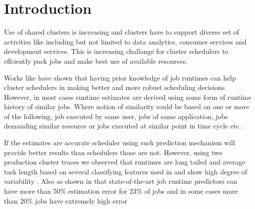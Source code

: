 \section{Introduction}
\label{sec:intro}



Use of shared clusters is increasing and clusters have to support diverse set
of activities like including but not limited to data analytics, consumer
services and development services. This is increasing challange for cluster
schedulers to effciently pack jobs and make best use of available resources.

Works like \cite{tetrisched, morpheus, 3Sigma,
Socc14:IfYouAreLateDon'tBlameUs} have shown that having prior knowledge of job
runtimes can help cluster schedulers in making better and more robust
scheduling decisions. However, in most cases runtime estimates are derived
using some form of runtime history of similar jobs. Where notion of similarity
could be based on one or more of the following, job executed by same user, jobs
of same application, jobs demanding similar resource or jobs executed at
similar point in time cycle etc \cite{jamiasvu, 3Sigma}. 


If the estimates are accurate scheduler using such prediction mechanism will
provide better results than schedulers those are not. However, using two
production cluster traces we observed that runtimes are long tailed
 and average task length based on several
classifying features used in \cite{3Sigma} and \cite{jamiasvu} show high degree
of variability . Also as shown in \cite{3Sigma} that state-of-the-art job runtime
predictors can have more than 50\% estimation error for 23\% of jobs and in
some cases more than 20\% jobs have extremely high error 

